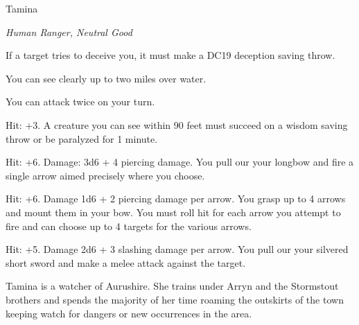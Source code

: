 \begin{monsterbox}{Tamina}
	\begin{hangingpar}
		\textit{Human Ranger, Neutral Good}
	\end{hangingpar}
	\dndline%
	\basics[%
	armorclass = 18,
	hitpoints  = 154,
	speed      = 40 ft
	]
	\dndline%
	\stats[
	STR = \stat{18}, %
	DEX = \stat{18},
	CON = \stat{12},
	INT = \stat{14},
	WIS = \stat{13},
	CHA = \stat{11}
	]
	\dndline%
	\details[%
	languages = {Common, Elvish, Pandaren},
	challenge = 10
	]
	\dndline%
	\begin{monsteraction}
		If a target tries to deceive you, it must make a DC19 deception saving throw.
	\end{monsteraction}	
	\begin{monsteraction}
		You can see clearly up to two miles over water.
	\end{monsteraction}
	\begin{monsteraction}
		You can attack twice on your turn.
	\end{monsteraction}
	\begin{monsteraction}
		Hit: +3. A creature you can see within 90 feet must succeed on a wisdom saving throw or be paralyzed for 1 minute.
	\end{monsteraction}
	\begin{monsteraction}
		Hit: +6. Damage: 3d6 + 4 piercing damage. You pull our your longbow and fire a single arrow aimed precisely where you choose. 
	\end{monsteraction}
	\begin{monsteraction}
		Hit: +6. Damage 1d6 + 2 piercing damage per arrow. You grasp up to 4 arrows and mount them in your bow. You must roll hit for each arrow you attempt to fire and can choose up to 4 targets for the various arrows.
	\end{monsteraction}
	\begin{monsteraction}
		Hit: +5. Damage 2d6 + 3 slashing damage per arrow. You pull our your silvered short sword and make a melee attack against the target.
	\end{monsteraction}

	Tamina is a watcher of Aurushire. She trains under Arryn and the Stormstout brothers and spends the majority of her time roaming the outskirts of the town keeping watch for dangers or new occurrences in the area.
\end{monsterbox}

